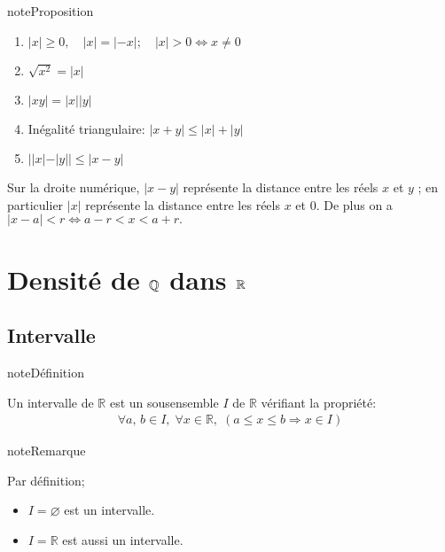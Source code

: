\documentclass[letterpaper,10pt,french]{jupyterBook}
\begin{document}
\begin{sphinxadmonition}{note}{Proposition}
\begin{enumerate}
%
\item {} 
\sphinxAtStartPar
\(|x|\geq0,\quad |x|=|-x|;\quad |x|>0\Leftrightarrow x\neq0\)

\item {} 
\sphinxAtStartPar
\(\sqrt{x^2}=|x|\)

\item {} 
\sphinxAtStartPar
\(|xy|=|x||y|\)

\item {} 
\sphinxAtStartPar
Inégalité triangulaire: \(|x+y|\leq |x|+|y|\)

\item {} 
\sphinxAtStartPar
\(||x|-|y||\leq |x-y|\)

\end{enumerate}
\end{sphinxadmonition}

\sphinxAtStartPar
Sur la droite numérique, \(|x-y|\) représente la distance entre les réels \(x\) et \(y\) ; en particulier \(|x|\) représente la distance
entre les réels \(x\) et 0. De plus on a \(|x-a|<r\Leftrightarrow a-r<x<a+r.\)


\section{Densité de \protect\(\mathbb{Q}\protect\) dans \protect\(\mathbb{R}\protect\)}
\label{\detokenize{proprties:densite-de-mathbb-q-dans-mathbb-r}}

\subsection{Intervalle}
\label{\detokenize{proprties:intervalle}}
\begin{sphinxadmonition}{note}{Définition}

\sphinxAtStartPar
Un intervalle de \(\mathbb{R}\) est un sous\sphinxhyphen{}ensemble \(I\) de \(\mathbb{R}\) vérifiant la propriété:
\begin{equation*}
\begin{split}
\forall a,\,b\in I,\;\forall x\in \mathbb{R},\;(a\leqslant x\leqslant b\Rightarrow x\in I)
\end{split}
\end{equation*}\end{sphinxadmonition}

\begin{sphinxadmonition}{note}{Remarque}

\sphinxAtStartPar
Par définition;
\begin{itemize}
\item {} 
\sphinxAtStartPar
\(I=\varnothing\) est un intervalle.

\item {} 
\sphinxAtStartPar
\(I=\mathbb{R}\) est aussi un intervalle.

\end{itemize}
\end{sphinxadmonition}
\end{document}
